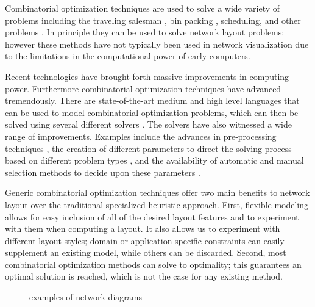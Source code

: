 \documentclass[a4paper,11pt,phdthesis,singlespace,twoside]{cssethesis}
\begin{document}
Combinatorial optimization techniques are used to solve a wide variety of problems including the traveling salesman \cite{huysentruyt2015applying}\cite{mladenovic2012general}, bin packing \cite{MILPcom}, scheduling, and other problems \cite{paschos2013paradigms}. In principle they can be used to solve network layout problems; however these methods have not typically been used in network visualization due to the limitations in the computational power of early computers. 

Recent technologies have brought forth massive improvements in computing power. Furthermore combinatorial optimization techniques have advanced tremendously. There are state-of-the-art medium and high level languages \cite{minizinc} that can be used to model combinatorial optimization problems, which can then be solved using several different solvers \cite{cplex}\cite{metodi-bee}\cite{feydy2013semantic}. The solvers have also witnessed a wide range of improvements. Examples include the advances in pre-processing techniques \cite{lima2011computational}, the creation of different parameters to direct the solving process based on different problem types \cite{cplex}, and the availability of automatic and manual selection methods to decide upon these parameters \cite{xu2011hydra}. 

Generic combinatorial optimization techniques offer two main benefits to network layout over the traditional specialized heuristic approach. First, flexible modeling allows for easy inclusion of all of the desired layout features and to experiment with them when computing a layout. It also allows us to experiment with different layout styles; domain or application specific constraints can easily supplement an existing model, while others can be discarded. Second, most combinatorial optimization methods can solve to optimality; this guarantees an optimal solution is reached, which is not the case for any existing method.

\begin{figure} 
\centering
{}



\caption{examples of network diagrams}
\end{figure}
	
\end{document}
